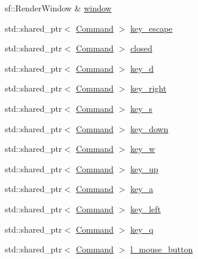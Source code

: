 \begin{DoxyCompactItemize}
\item 
sf\+::\+Render\+Window \& \hyperlink{class_engine_input_handler_ae534eb94ba995a38f87faf37ed309ba5}{window}
\item 
std\+::shared\+\_\+ptr$<$ \hyperlink{class_command}{Command} $>$ \hyperlink{class_engine_input_handler_a864479881a1e214952f4a2aea3a307bf}{key\+\_\+escape}
\item 
std\+::shared\+\_\+ptr$<$ \hyperlink{class_command}{Command} $>$ \hyperlink{class_engine_input_handler_a0795da79edb03ad26aa5d8aec9fc2a04}{closed}
\item 
std\+::shared\+\_\+ptr$<$ \hyperlink{class_command}{Command} $>$ \hyperlink{class_engine_input_handler_a54e54d55b3fb0b52efcebe616849cdd1}{key\+\_\+d}
\item 
std\+::shared\+\_\+ptr$<$ \hyperlink{class_command}{Command} $>$ \hyperlink{class_engine_input_handler_ad74ef644e2130ed5552173993a358b20}{key\+\_\+right}
\item 
std\+::shared\+\_\+ptr$<$ \hyperlink{class_command}{Command} $>$ \hyperlink{class_engine_input_handler_ac8cb7f400955f76a2258a64f0812c309}{key\+\_\+s}
\item 
std\+::shared\+\_\+ptr$<$ \hyperlink{class_command}{Command} $>$ \hyperlink{class_engine_input_handler_a6812313632a9cf68132b99b4179ab1a4}{key\+\_\+down}
\item 
std\+::shared\+\_\+ptr$<$ \hyperlink{class_command}{Command} $>$ \hyperlink{class_engine_input_handler_adc4f776b64656ce3b549a1efcbba5dfb}{key\+\_\+w}
\item 
std\+::shared\+\_\+ptr$<$ \hyperlink{class_command}{Command} $>$ \hyperlink{class_engine_input_handler_a325f37f96aee129b9fc375c7a784798e}{key\+\_\+up}
\item 
std\+::shared\+\_\+ptr$<$ \hyperlink{class_command}{Command} $>$ \hyperlink{class_engine_input_handler_ae2da02fb4013bf0e85c951ad16efd48a}{key\+\_\+a}
\item 
std\+::shared\+\_\+ptr$<$ \hyperlink{class_command}{Command} $>$ \hyperlink{class_engine_input_handler_ae23b9a5cdfe4e076ca5337e5e4e17100}{key\+\_\+left}
\item 
std\+::shared\+\_\+ptr$<$ \hyperlink{class_command}{Command} $>$ \hyperlink{class_engine_input_handler_a87304a132a8502abc0d4b74abf104bfe}{key\+\_\+q}
\item 
std\+::shared\+\_\+ptr$<$ \hyperlink{class_command}{Command} $>$ \hyperlink{class_engine_input_handler_a1d5d91670520e1424bf5dac389d65069}{l\+\_\+mouse\+\_\+button}
\end{DoxyCompactItemize}
